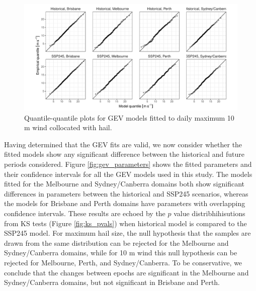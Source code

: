 \documentclass[]{agujournal2019}\usepackage[]{graphicx}\usepackage[]{xcolor}
\begin{document}
\begin{figure}[!ht]
      \includegraphics[width=\textwidth]{figures/qq_wind}
      \caption{Quantile-quantile plots for GEV models fitted to daily maximum 10 m wind collocated with hail.}
      \label{fig:qq_wind}
\end{figure}
 
Having determined that the GEV fits are valid, we now consider whether the fitted models show any significant difference between the historical and future periods considered. Figure \ref{fig:gev_parameters} shows the fitted parameters and their confidence intervals for all the GEV models used in this study. The models fitted for the Melbourne and Sydney/Canberra domains both show significant differences in parameters between the historical and SSP245 scenarios, whereas the models for Brisbane and Perth domains have parameters with overlapping confidence intervals. These results are echoed by the $p$ value distribhihisutions from KS tests (Figure \ref{fig:ks_pvals}) when historical model is compared to the SSP245 model. For maximum hail size, the null hypothesis that the samples are drawn from the same distribution can be rejected for the Melbourne and Sydney/Canberra domains, while for 10 m wind this null hypothesis can be rejected for Melbourne, Perth, and Sydney/Canberra. To be conservative, we conclude that the changes between epochs are significant in the Melbourne and Sydney/Canberra domains, but not significant in Brisbane and Perth.
\end{document}
